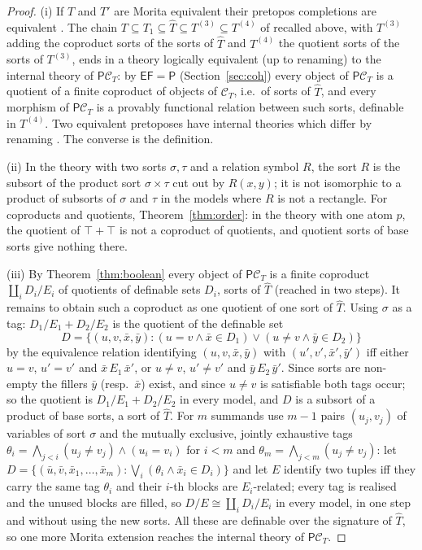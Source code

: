 \documentclass[11pt]{amsart}
\theoremstyle{definition}
\newcommand{\FF}{\mathsf F}
\newcommand{\EE}{\mathsf E}
\newcommand{\PP}{\mathsf P}
\newcommand{\cC}{\mathcal C}
\begin{document}
\begin{proof}
(i) If $T$ and $T'$ are Morita equivalent their pretopos completions are
equivalent \cite[Cor.~4.9]{Tsem17}. The chain $T\subseteq T_1\subseteq
\widehat T\subseteq T^{(3)}\subseteq T^{(4)}$ of \cite{Tsem17} recalled
above, with $T^{(3)}$ adding the coproduct sorts of the sorts of
$\widehat T$ and $T^{(4)}$ the quotient sorts of the sorts of $T^{(3)}$,
ends in a theory logically equivalent (up to renaming) to the internal
theory of $\PP\cC_T$: by $\EE\FF=\PP$ (Section~\ref{sec:coh}) every
object of $\PP\cC_T$ is a quotient of a finite coproduct of objects of
$\cC_T$, i.e.\ of sorts of $\widehat T$, and every morphism of $\PP\cC_T$
is a provably functional relation between such sorts, definable in
$T^{(4)}$. Two equivalent pretoposes have internal theories which differ
by renaming \cite[p.~20]{Tsem17}. The converse is the definition.

(ii) In the theory with two sorts $\sigma,\tau$ and a relation symbol
$R$, the sort $R$ is the subsort of the product sort $\sigma\times\tau$
cut out by $R(x,y)$; it is not isomorphic to a product of subsorts of
$\sigma$ and $\tau$ in the models where $R$ is not a rectangle. For
coproducts and quotients, Theorem~\ref{thm:order}: in the theory with
one atom $p$, the quotient of $\top+\top$ is not a coproduct of
quotients, and quotient sorts of base sorts give nothing there.

(iii) By Theorem~\ref{thm:boolean} every object of $\PP\cC_T$ is a
finite coproduct $\coprod_i D_i/E_i$ of quotients of definable sets
$D_i$, sorts of $\widehat T$ (reached in two steps). It remains to
obtain such a coproduct as one quotient of one sort of $\widehat T$.
Using $\sigma$ as a tag: $D_1/E_1+D_2/E_2$ is the quotient of the
definable set
\[
D=\{(u,v,\bar x,\bar y):(u=v\wedge\bar x\in D_1)\vee(u\ne v\wedge\bar
y\in D_2)\}
\]
by the equivalence relation identifying $(u,v,\bar x,\bar y)$ with
$(u',v',\bar x',\bar y')$ iff either $u=v$, $u'=v'$ and $\bar x\,E_1\,
\bar x'$, or $u\ne v$, $u'\ne v'$ and $\bar y\,E_2\,\bar y'$. Since
sorts are non-empty the fillers $\bar y$ (resp.\ $\bar x$) exist, and
since $u\ne v$ is satisfiable both tags occur; so the quotient is
$D_1/E_1+D_2/E_2$ in every model, and $D$ is a subsort of a product of
base sorts, a sort of $\widehat T$. For $m$ summands use $m-1$ pairs
$(u_j,v_j)$ of variables of sort $\sigma$ and the mutually exclusive,
jointly exhaustive tags $\theta_i=\bigwedge_{j<i}(u_j\ne v_j)\wedge
(u_i=v_i)$ for $i<m$ and $\theta_m=\bigwedge_{j<m}(u_j\ne v_j)$: let
$D=\{(\bar u,\bar v,\bar x_1,\dots,\bar x_m):\bigvee_i(\theta_i\wedge
\bar x_i\in D_i)\}$ and let $E$ identify two tuples iff they carry the
same tag $\theta_i$ and their $i$-th blocks are $E_i$-related; every tag
is realised and the unused blocks are filled, so $D/E\cong\coprod_i
D_i/E_i$ in every model, in one step and without using the new sorts.
All these are definable over the signature of $\widehat T$, so one more
Morita extension reaches the internal theory of $\PP\cC_T$.
\end{proof}
\end{document}
